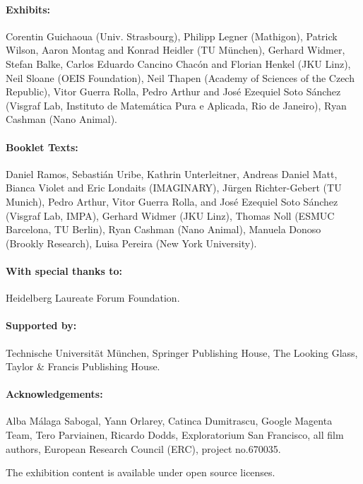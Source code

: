 \paragraph{Exhibits:}
Corentin Guichaoua (Univ. Strasbourg), Philipp Legner (Mathigon), Patrick Wilson, Aaron Montag and Konrad Heidler (TU
 München), Gerhard Widmer, Stefan Balke, Carlos Eduardo Cancino Chacón and Florian Henkel (JKU Linz), Neil Sloane (OEIS Foundation), Neil Thapen (Academy of Sciences of the Czech Republic), Vitor Guerra Rolla, Pedro Arthur and José Ezequiel Soto Sánchez (Visgraf Lab, Instituto de Matemática Pura e Aplicada, Rio de Janeiro), Ryan Cashman (Nano Animal).

\paragraph{Booklet Texts:}
Daniel Ramos, Sebastián Uribe, Kathrin Unterleitner, Andreas Daniel Matt, Bianca Violet and Eric Londaits (IMAGINARY), Jürgen Richter-Gebert (TU Munich), Pedro Arthur, Vitor Guerra Rolla, and José Ezequiel Soto Sánchez (Visgraf Lab, IMPA), Gerhard Widmer (JKU Linz), Thomas Noll (ESMUC Bar\-ce\-lo\-na, TU Berlin), Ryan Cashman (Nano Animal), Manuela Donoso (Brookly Research), Luisa Pereira (New York University).


\paragraph{With special thanks to:}
Heidelberg Laureate Forum Foundation.

\paragraph{Supported by:}
Technische Universität München, Springer Publishing House, The Looking Glass, Taylor \& Francis Publishing House.

\paragraph{Acknowledgements:}
Alba Málaga Sabogal, Yann Orlarey, Catinca Dumitrascu, Google Magenta Team, Tero Parviainen, Ricardo Dodds, Exploratorium San Francisco, all film authors, European Research Council (ERC), project no.670035.


The exhibition content is available under open source licenses.
\normalsize
